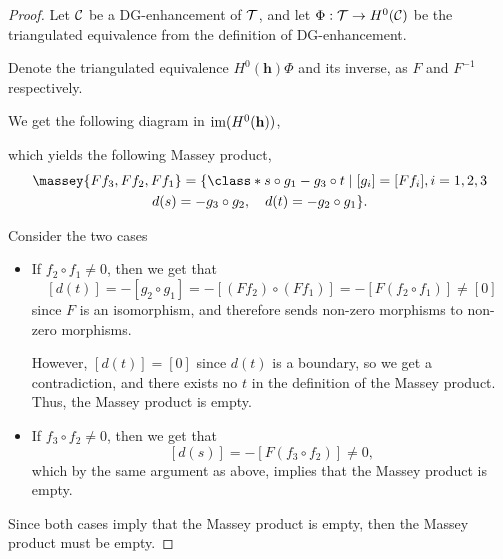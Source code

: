 \begin{proof}
    Let \( {\mathcal{C}} \) be a DG-enhancement of \( {\mathcal{T}} \), and let \( \Phi: {\mathcal{T}} \to H^0({\mathcal{C}}) \) be the triangulated equivalence from the definition of DG-enhancement.

    Denote the triangulated equivalence \( H^0(\mathbf{h}) \Phi \) and its inverse, as \( F \) and \( F^{-1} \) respectively.

    We get the following diagram in \( \operatorname{im}(H^0(\mathbf{h})) \),
    \begin{center}
    \end{center}
    which yields the following Massey product,
    \begin{multline*}
        \massey{F f_3, F f_2, F f_1} =
        \{
            \class*{
                s \circ g_1 - g_3 \circ t
            }
            \mid [g_i] = [F f_i], i = 1, 2, 3 \\
            d(s) = - g_3 \circ g_2, \quad
            d(t) = - g_2 \circ g_1
        \}.
    \end{multline*}

    Consider the two cases
    \begin{itemize}
        \item {
            If \( f_2 \circ f_1 \neq 0 \), then we get that
            \[
                [d(t)] = - [g_2 \circ g_1] = - [(F f_2) \circ (F f_1)] = - [F (f_2 \circ f_1)] \neq [0]
            \]
            since \( F \) is an isomorphism, and therefore sends non-zero morphisms to non-zero morphisms.

            However, \( [d(t)] = [0] \) since \( d(t) \) is a boundary, so we get a contradiction, and there exists no \( t \) in the definition of the Massey product. Thus, the Massey product is empty.
        }
        \item {
            If \( f_3 \circ f_2 \neq 0 \), then we get that
            \[
                [d(s)] = - [F (f_3 \circ f_2)] \neq 0,
            \]
            which by the same argument as above, implies that the Massey product is empty.
        }
    \end{itemize}
    Since both cases imply that the Massey product is empty, then the Massey product must be empty.
\end{proof}


